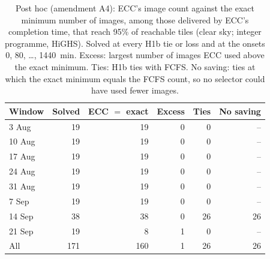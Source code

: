 \begin{table}[!t]
\centering
\footnotesize
\renewcommand{\arraystretch}{1.2}
\setlength{\tabcolsep}{3.5pt}
\caption{Post hoc (amendment A4): ECC's image count against the exact minimum number of images, among
those delivered by ECC's completion time, that reach 95\% of reachable tiles (clear sky; integer programme,
HiGHS). Solved at every H1b tie or loss and at the onsets 0, 80, \dots, 1440~min. Excess: largest
number of images ECC used above the exact minimum. Ties: H1b ties with FCFS. No saving: ties at which the
exact minimum equals the FCFS count, so no selector could have used fewer images.}
\label{tab:a4_exact_economy}
\begin{tabular}{|l|r|r|r|r|r|}
\hline
Window & Solved & ECC $=$ exact & Excess & Ties & No saving \\
\hline
3 Aug & 19 & 19 & 0 & 0 & -- \\
\hline
10 Aug & 19 & 19 & 0 & 0 & -- \\
\hline
17 Aug & 19 & 19 & 0 & 0 & -- \\
\hline
24 Aug & 19 & 19 & 0 & 0 & -- \\
\hline
31 Aug & 19 & 19 & 0 & 0 & -- \\
\hline
7 Sep & 19 & 19 & 0 & 0 & -- \\
\hline
14 Sep & 38 & 38 & 0 & 26 & 26 \\
\hline
21 Sep & 19 & 8 & 1 & 0 & -- \\
\hline
All & 171 & 160 & 1 & 26 & 26 \\
\hline
\end{tabular}
\end{table}
